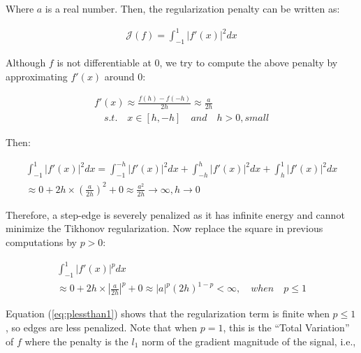 Where $a$ is a real number. Then, the regularization penalty can be written as:

\begin{equation}
\begin{gathered}
\mathcal{J}(f) = \int_{-1}^{1} \left | {f}'(x) \right |^{2}dx
\end{gathered}
\end{equation}

Although $f$ is not differentiable at $0$, we try to compute the above penalty by approximating ${f}'(x)$ around $0$:

\begin{equation}
\begin{gathered}
{f}'(x) \approx \frac{f(h)-f(-h)}{2h} \approx \frac{a}{2h} \\
\quad s.t. \quad x\in [h,-h] \quad and \quad h>0, small
\end{gathered}
\end{equation}

Then:

\begin{equation}
\begin{gathered}
\int_{-1}^{1} \left | {f}'(x) \right |^{2}dx = \int_{-1}^{-h} \left | {f}'(x) \right |^{2}dx + \int_{-h}^{h} \left | {f}'(x) \right |^{2}dx + \int_{h}^{1} \left | {f}'(x) \right |^{2}dx \\
\approx 0 + 2h \times (\frac{a}{2h})^{2} + 0 \approx \frac{a^2}{2h} \rightarrow \infty, h \rightarrow 0
\end{gathered}
\end{equation}

Therefore, a step-edge is severely penalized as it has infinite energy and cannot minimize the Tikhonov regularization. Now replace the square in previous computations by $p>0$:

\begin{equation}
\label{eq:plessthan1}
\begin{gathered}
\int_{-1}^{1} \left | {f}'(x) \right |^{p}dx \\
\approx 0 + 2h \times |\frac{a}{2h}|^{p} + 0 \approx |a|^{p}(2h)^{1-p} < \infty, \quad when \quad p \leq 1
\end{gathered}
\end{equation}

Equation (\ref{eq:plessthan1}) shows that the regularization term is finite when $p \leq 1$, so edges are less penalized. Note that when $p=1$, this is the ``Total Variation'' of $f$ \cite{rudin1992nonlinear} where the penalty is the $l_{1}$ norm of the gradient magnitude of the signal, i.e.,

